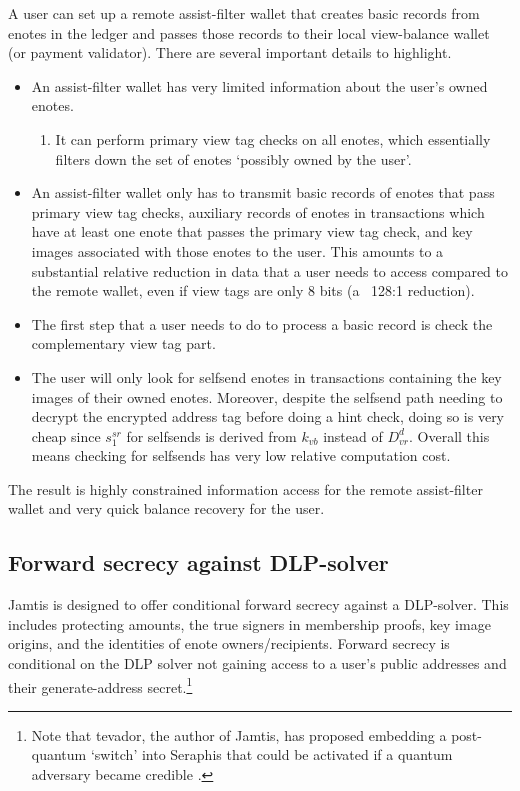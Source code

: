 A user can set up a remote assist-filter wallet that creates basic records from enotes in the ledger and passes those records to their local view-balance wallet (or payment validator). There are several important details to highlight.
\begin{itemize}
    \item An assist-filter wallet has very limited information about the user's owned enotes.
    \begin{enumerate}
        \item It can perform primary view tag checks on all enotes, which essentially filters down the set of enotes `possibly owned by the user'.
    \end{enumerate}

    \item An assist-filter wallet only has to transmit basic records of enotes that pass primary view tag checks, auxiliary records of enotes in transactions which have at least one enote that passes the primary view tag check, and key images associated with those enotes to the user. This amounts to a substantial relative reduction in data that a user needs to access compared to the remote wallet, even if view tags are only 8 bits (a ~128:1 reduction).

    \item The first step that a user needs to do to process a basic record is check the complementary view tag part.

    \item The user will only look for selfsend enotes in transactions containing the key images of their owned enotes. Moreover, despite the selfsend path needing to decrypt the encrypted address tag before doing a hint check, doing so is very cheap since $s^{sr}_1$ for selfsends is derived from $k_{vb}$ instead of $D^d_{vr}$. Overall this means checking for selfsends has very low relative computation cost.
\end{itemize}

The result is highly constrained information access for the remote assist-filter wallet and very quick balance recovery for the user.


\subsection{Forward secrecy against DLP-solver}
\label{subsec:jamtis-forward-secrecy-dlp-solver}

Jamtis is designed to offer conditional forward secrecy against a DLP-solver. This includes protecting amounts, the true signers in membership proofs, key image origins, and the identities of enote owners/recipients. Forward secrecy is conditional on the DLP solver not gaining access to a user's public addresses and their generate-address secret.\footnote{Note that tevador, the author of Jamtis, has proposed embedding a post-quantum `switch' into Seraphis that could be activated if a quantum adversary became credible \cite{seraphis-post-quantum-switch}.}

